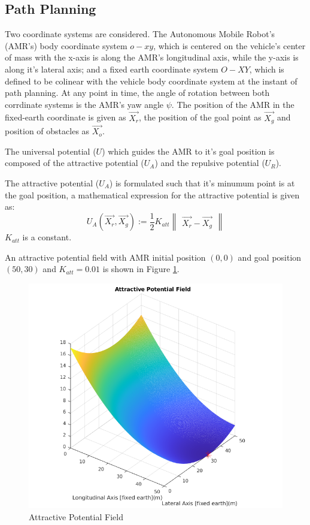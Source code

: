 \documentclass[a4paper, twocolumn]{article}
\begin{document}
\subsection{Path Planning}
Two coordinate systems are considered. The Autonomous Mobile Robot's (AMR's) body coordinate system $\mathit{o-xy}$, 
which is centered on the vehicle's center of mass with the x-axis is along the AMR's longitudinal axis, 
while the y-axis is along it's lateral axis; and a fixed earth coordinate system $\mathit{O-XY}$, 
which is defined to be colinear with the vehicle body coordinate system at the instant of path planning. 
At any point in time, the angle of rotation between both corrdinate systems is the AMR's yaw angle $\psi$. 
The position of the AMR in the fixed-earth coordinate is given as $\vec{X_{r}}$, 
the position of the goal point as $\vec{X_{g}}$ and position of obstacles as $\vec{X_{o}}$.

The universal potential ($U$) which guides the AMR to it's goal position is composed of the attractive potential ($U_{A}$) 
and the repulsive potential ($U_{R}$).

The attractive potential ($U_{A}$) is formulated such that it's minumum point is at the goal position, 
a mathematical expression for the attractive potential is given as:
$$
U_{A}(\vec{X_{r}}, \vec{X_{g}}):= \frac{1}{2} K_{att} \begin{Vmatrix}\vec{X_{r}} - \vec{X_{g}}\end{Vmatrix}
$$
\noindent
$K_{att}$ is a constant.

\noindent
An attractive potential field with AMR initial position $(0, 0)$ and 
goal position $(50, 30)$ and $K_{att}= 0.01$ is shown in Figure \ref{fig:u_att}.

\begin{figure}
    \centering
    \includegraphics[scale=0.45]{presentation/img/u_att.png}
    \caption{Attractive Potential Field}
    \label{fig:u_att}
\end{figure}
\end{document}
